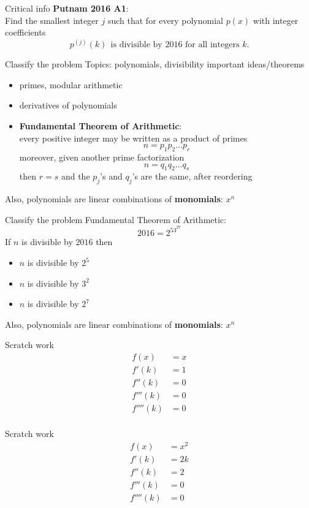 \documentclass{beamer}
\begin{document}
\begin{frame}{Critical info}
\textbf{Putnam 2016 A1}:\\
Find the {\color{red} smallest integer} $j$ such that for every polynomial $p(x)$ with integer coefficients
$$p^{(j)}(k)\ \ \text{is divisible by $2016$ for all integers $k$}.$$
\end{frame}

\begin{frame}{Classify the problem}
Topics: polynomials, divisibility
\pause
important ideas/theorems
\begin{itemize}
\pause
\item primes, modular arithmetic
\pause
\item derivatives of polynomials
\pause
\item \textbf{Fundamental Theorem of Arithmetic}:\\
every positive integer may be written as a product of primes
$$n=p_1p_2\dots p_r$$
moreover, given another prime factorization
$$n=q_1q_2\dots q_s$$
then $r=s$ and the $p_j$'s and $q_j$'s are the same, after reordering
\end{itemize}
\pause
Also, polynomials are linear combinations of \textbf{monomials}: $x^n$
\end{frame}

\begin{frame}{Classify the problem}
Fundamental Theorem of Arithmetic:
$$2016 = 2^53^27$$
\pause
If $n$ is divisible by $2016$ then
\begin{itemize}
\pause
\item $n$ is divisible by $2^5$
\pause
\item $n$ is divisible by $3^2$
\pause
\item $n$ is divisible by $2^7$
\end{itemize}
\pause
Also, polynomials are linear combinations of \textbf{monomials}: $x^n$
\end{frame}

\begin{frame}{Scratch work}
\begin{align*}
f(x) &= x\\
f'(k) &= 1\\
f''(k) &= 0\\
f'''(k) &= 0\\
f''''(k) &= 0\\
\end{align*}
\end{frame}

\begin{frame}{Scratch work}
\begin{align*}
f(x) &= x^2\\
f'(k) &= 2k\\
f''(k) &= 2\\
f'''(k) &= 0\\
f''''(k) &= 0\\
\end{align*}
\end{frame}
\end{document}
